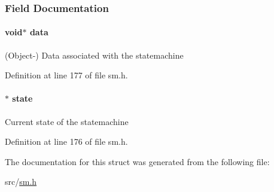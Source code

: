 \subsubsection{Field Documentation}
\paragraph[{\texorpdfstring{data}{data}}]{\setlength{\rightskip}{0pt plus 5cm}void$\ast$ data}\hypertarget{structsm__t_a735984d41155bc1032e09bece8f8d66d}{}\label{structsm__t_a735984d41155bc1032e09bece8f8d66d}
(Object-\/) Data associated with the statemachine 

Definition at line 177 of file sm.\+h.

\paragraph[{\texorpdfstring{state}{state}}]{$\ast$ state}\hypertarget{structsm__t_ab950ad4739c4f74fc7070daba557c707}{}\label{structsm__t_ab950ad4739c4f74fc7070daba557c707}
Current state of the statemachine 

Definition at line 176 of file sm.\+h.



The documentation for this struct was generated from the following file\+:\begin{DoxyCompactItemize}
\item 
src/\hyperlink{sm_8h}{sm.\+h}\end{DoxyCompactItemize}

